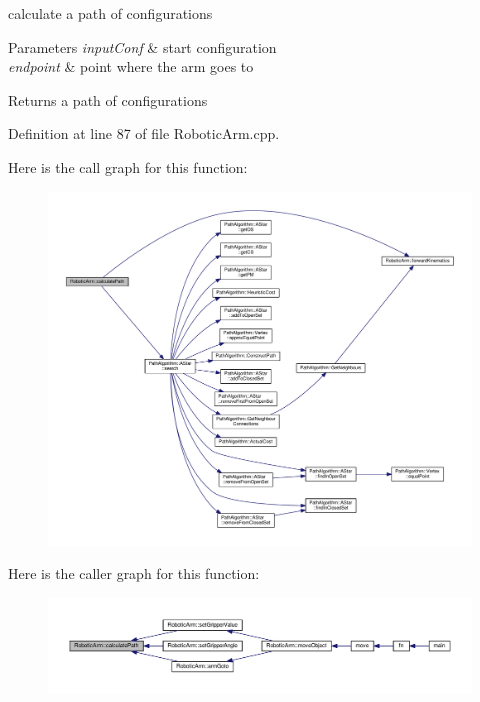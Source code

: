 calculate a path of configurations 


\begin{DoxyParams}{Parameters}
{\em input\+Conf} & start configuration \\
\hline
{\em endpoint} & point where the arm goes to \\
\hline
\end{DoxyParams}
\begin{DoxyReturn}{Returns}
a path of configurations 
\end{DoxyReturn}


Definition at line 87 of file Robotic\+Arm.\+cpp.



Here is the call graph for this function\+:\nopagebreak
\begin{figure}[H]
\begin{center}
\leavevmode
\includegraphics[width=350pt]{class_robotic_arm_ae925ea4c5ea53ca359399a07d0ef4f76_cgraph}
\end{center}
\end{figure}




Here is the caller graph for this function\+:\nopagebreak
\begin{figure}[H]
\begin{center}
\leavevmode
\includegraphics[width=350pt]{class_robotic_arm_ae925ea4c5ea53ca359399a07d0ef4f76_icgraph}
\end{center}
\end{figure}


